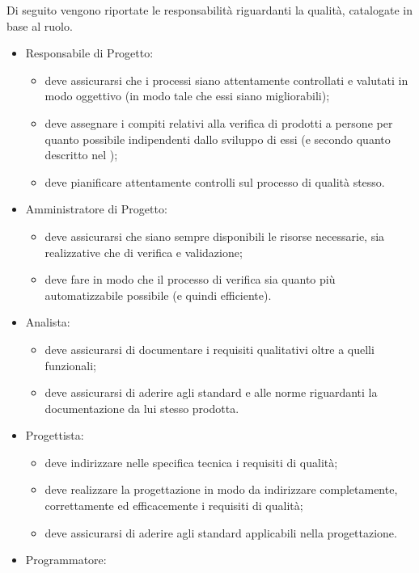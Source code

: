 		Di seguito vengono riportate le responsabilità riguardanti la qualità, catalogate in base al ruolo.
		\begin{itemize}
			\item Responsabile di Progetto:
			\begin{itemize}
				\item deve assicurarsi che i processi siano attentamente controllati e valutati in modo oggettivo (in modo tale che essi siano 
				migliorabili);
				\item deve assegnare i compiti relativi alla verifica di prodotti a persone per quanto possibile indipendenti dallo sviluppo di essi 
				(e secondo quanto descritto nel );
				\item deve pianificare attentamente controlli sul processo di qualità stesso.
			\end{itemize}
			\item Amministratore di Progetto:
			\begin{itemize}
				\item deve assicurarsi che siano sempre disponibili le risorse necessarie, sia realizzative che di verifica e validazione;
				\item deve fare in modo che il processo di verifica sia quanto più automatizzabile possibile (e quindi efficiente).
			\end{itemize}
			\item Analista:
			\begin{itemize}
				\item deve assicurarsi di documentare i requisiti qualitativi oltre a quelli funzionali;
				\item deve assicurarsi di aderire agli standard e alle norme riguardanti la documentazione da lui stesso prodotta.
			\end{itemize}
			\item Progettista:
			\begin{itemize}
				\item deve indirizzare nelle specifica tecnica i requisiti di qualità;
				\item deve realizzare la progettazione in modo da indirizzare completamente, correttamente ed efficacemente i requisiti di qualità;
				\item deve assicurarsi di aderire agli standard applicabili nella progettazione.
			\end{itemize}
			\item Programmatore:
			\begin{itemize}

\end{itemize}
\end{itemize}
